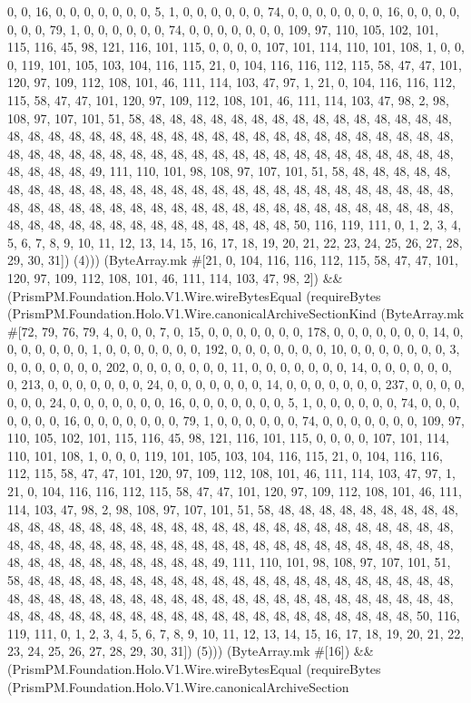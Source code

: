 \documentclass[11pt]{article}
\begin{document}
0, 0, 16, 0, 0, 0, 0, 0, 0, 0, 5, 1, 0, 0, 0, 0, 0, 0, 74, 0, 0, 0, 0, 0, 0, 0, 16, 0, 0, 0, 0, 0, 0, 0, 79, 1, 0, 0, 0, 0, 0, 0, 74, 0, 0, 0, 0, 0, 0, 0, 109, 97, 110, 105, 102, 101, 115, 116, 45, 98, 121, 116, 101, 115, 0, 0, 0, 0, 107, 101, 114, 110, 101, 108, 1, 0, 0, 0, 119, 101, 105, 103, 104, 116, 115, 21, 0, 104, 116, 116, 112, 115, 58, 47, 47, 101, 120, 97, 109, 112, 108, 101, 46, 111, 114, 103, 47, 97, 1, 21, 0, 104, 116, 116, 112, 115, 58, 47, 47, 101, 120, 97, 109, 112, 108, 101, 46, 111, 114, 103, 47, 98, 2, 98, 108, 97, 107, 101, 51, 58, 48, 48, 48, 48, 48, 48, 48, 48, 48, 48, 48, 48, 48, 48, 48, 48, 48, 48, 48, 48, 48, 48, 48, 48, 48, 48, 48, 48, 48, 48, 48, 48, 48, 48, 48, 48, 48, 48, 48, 48, 48, 48, 48, 48, 48, 48, 48, 48, 48, 48, 48, 48, 48, 48, 48, 48, 48, 48, 48, 48, 48, 48, 48, 49, 111, 110, 101, 98, 108, 97, 107, 101, 51, 58, 48, 48, 48, 48, 48, 48, 48, 48, 48, 48, 48, 48, 48, 48, 48, 48, 48, 48, 48, 48, 48, 48, 48, 48, 48, 48, 48, 48, 48, 48, 48, 48, 48, 48, 48, 48, 48, 48, 48, 48, 48, 48, 48, 48, 48, 48, 48, 48, 48, 48, 48, 48, 48, 48, 48, 48, 48, 48, 48, 48, 48, 48, 48, 50, 116, 119, 111, 0, 1, 2, 3, 4, 5, 6, 7, 8, 9, 10, 11, 12, 13, 14, 15, 16, 17, 18, 19, 20, 21, 22, 23, 24, 25, 26, 27, 28, 29, 30, 31]) (4))) (ByteArray.mk \#[21, 0, 104, 116, 116, 112, 115, 58, 47, 47, 101, 120, 97, 109, 112, 108, 101, 46, 111, 114, 103, 47, 98, 2]) \&\& (PrismPM.Foundation.Holo.V1.Wire.wireBytesEqual (requireBytes (PrismPM.Foundation.Holo.V1.Wire.canonicalArchiveSectionKind (ByteArray.mk \#[72, 79, 76, 79, 4, 0, 0, 0, 7, 0, 15, 0, 0, 0, 0, 0, 0, 0, 178, 0, 0, 0, 0, 0, 0, 0, 14, 0, 0, 0, 0, 0, 0, 0, 1, 0, 0, 0, 0, 0, 0, 0, 192, 0, 0, 0, 0, 0, 0, 0, 10, 0, 0, 0, 0, 0, 0, 0, 3, 0, 0, 0, 0, 0, 0, 0, 202, 0, 0, 0, 0, 0, 0, 0, 11, 0, 0, 0, 0, 0, 0, 0, 14, 0, 0, 0, 0, 0, 0, 0, 213, 0, 0, 0, 0, 0, 0, 0, 24, 0, 0, 0, 0, 0, 0, 0, 14, 0, 0, 0, 0, 0, 0, 0, 237, 0, 0, 0, 0, 0, 0, 0, 24, 0, 0, 0, 0, 0, 0, 0, 16, 0, 0, 0, 0, 0, 0, 0, 5, 1, 0, 0, 0, 0, 0, 0, 74, 0, 0, 0, 0, 0, 0, 0, 16, 0, 0, 0, 0, 0, 0, 0, 79, 1, 0, 0, 0, 0, 0, 0, 74, 0, 0, 0, 0, 0, 0, 0, 109, 97, 110, 105, 102, 101, 115, 116, 45, 98, 121, 116, 101, 115, 0, 0, 0, 0, 107, 101, 114, 110, 101, 108, 1, 0, 0, 0, 119, 101, 105, 103, 104, 116, 115, 21, 0, 104, 116, 116, 112, 115, 58, 47, 47, 101, 120, 97, 109, 112, 108, 101, 46, 111, 114, 103, 47, 97, 1, 21, 0, 104, 116, 116, 112, 115, 58, 47, 47, 101, 120, 97, 109, 112, 108, 101, 46, 111, 114, 103, 47, 98, 2, 98, 108, 97, 107, 101, 51, 58, 48, 48, 48, 48, 48, 48, 48, 48, 48, 48, 48, 48, 48, 48, 48, 48, 48, 48, 48, 48, 48, 48, 48, 48, 48, 48, 48, 48, 48, 48, 48, 48, 48, 48, 48, 48, 48, 48, 48, 48, 48, 48, 48, 48, 48, 48, 48, 48, 48, 48, 48, 48, 48, 48, 48, 48, 48, 48, 48, 48, 48, 48, 48, 49, 111, 110, 101, 98, 108, 97, 107, 101, 51, 58, 48, 48, 48, 48, 48, 48, 48, 48, 48, 48, 48, 48, 48, 48, 48, 48, 48, 48, 48, 48, 48, 48, 48, 48, 48, 48, 48, 48, 48, 48, 48, 48, 48, 48, 48, 48, 48, 48, 48, 48, 48, 48, 48, 48, 48, 48, 48, 48, 48, 48, 48, 48, 48, 48, 48, 48, 48, 48, 48, 48, 48, 48, 48, 50, 116, 119, 111, 0, 1, 2, 3, 4, 5, 6, 7, 8, 9, 10, 11, 12, 13, 14, 15, 16, 17, 18, 19, 20, 21, 22, 23, 24, 25, 26, 27, 28, 29, 30, 31]) (5))) (ByteArray.mk \#[16]) \&\& (PrismPM.Foundation.Holo.V1.Wire.wireBytesEqual (requireBytes (PrismPM.Foundation.Holo.V1.Wire.canonicalArchiveSection 
\end{document}
